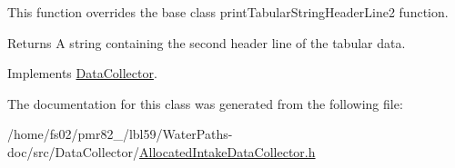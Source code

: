 This function overrides the base class {\ttfamily print\+Tabular\+String\+Header\+Line2} function.

\begin{DoxyReturn}{Returns}
A string containing the second header line of the tabular data. 
\end{DoxyReturn}


Implements \mbox{\hyperlink{classDataCollector_af01ea961314be2164f39e6d4cd59e443}{Data\+Collector}}.



The documentation for this class was generated from the following file\+:\begin{DoxyCompactItemize}
\item 
/home/fs02/pmr82\+\_/lbl59/\+Water\+Paths-\/doc/src/\+Data\+Collector/\mbox{\hyperlink{AllocatedIntakeDataCollector_8h}{Allocated\+Intake\+Data\+Collector.\+h}}\end{DoxyCompactItemize}
